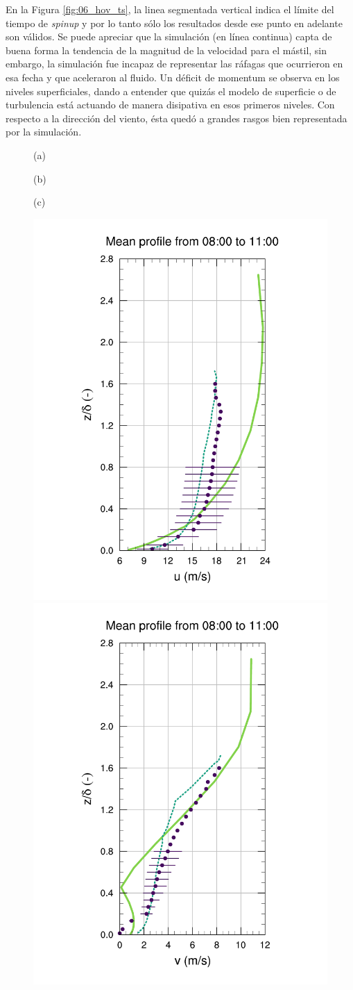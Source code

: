 En la Figura \ref{fig:06_hov_ts}, la linea segmentada vertical indica el límite del tiempo de \emph{spinup} y por lo tanto sólo los resultados desde ese punto en adelante son válidos. Se puede apreciar que la simulación (en línea continua) capta de buena forma la tendencia de la magnitud de la velocidad para el mástil, sin embargo, la simulación fue incapaz de representar las ráfagas que ocurrieron en esa fecha y que aceleraron al fluido. Un déficit de momentum se observa en los niveles superficiales, dando a entender que quizás el modelo de superficie o de turbulencia está actuando de manera disipativa en esos primeros niveles. Con respecto a la dirección del viento, ésta quedó a grandes rasgos bien representada por la simulación.

\begin{figure}[H]
	\begin{minipage}{0.33\linewidth}
		\centering \hspace{1.5cm}(a)
	\end{minipage}%
	\begin{minipage}{0.33\linewidth}
		\centering \hspace{1cm}(b)
	\end{minipage}%
	\begin{minipage}{0.33\linewidth}
		\centering \hspace{1cm}(c)
	\end{minipage}%
	\vspace{-3mm}
	\begin{center}
	\includegraphics[height=0.62\linewidth,page=37,trim={35mm 10mm 41mm 25mm},clip]{Imagenes/06/hov/9u}%
	\includegraphics[height=0.62\linewidth,page=37,trim={48mm 10mm 41mm 25mm},clip]{Imagenes/06/hov/9v}%

\end{center}
\end{figure}
